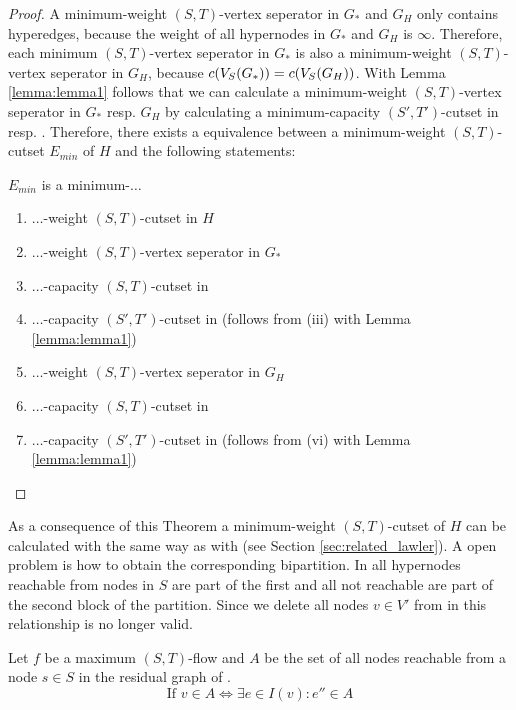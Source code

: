 \begin{proof}
A minimum-weight $(S,T)$-vertex seperator in $G_*$ and $G_H$ only contains hyperedges, because
the weight of all hypernodes in $G_*$ and $G_H$ is $\infty$. Therefore, each minimum
$(S,T)$-vertex seperator in $G_*$ is also a minimum-weight $(S,T)$-vertex seperator in $G_H$,
because $c(V_S(G_*)) = c(V_S(G_H))$. With Lemma \ref{lemma:lemma1} follows that we can calculate
a minimum-weight $(S,T)$-vertex seperator in $G_*$ resp. $G_H$ by calculating a minimum-capacity
$(S',T')$-cutset in  resp. . Therefore, there exists a equivalence
between a minimum-weight $(S,T)$-cutset $E_{min}$ of $H$ and the following statements: 

$E_{min}$ is a minimum-$\ldots$
\begin{enumerate}
\item $\ldots$-weight $(S,T)$-cutset in $H$
\item $\ldots$-weight $(S,T)$-vertex seperator in $G_*$
\item $\ldots$-capacity $(S,T)$-cutset in 
\item $\ldots$-capacity $(S',T')$-cutset in  (follows from (iii) with Lemma \ref{lemma:lemma1})
\item $\ldots$-weight $(S,T)$-vertex seperator in $G_H$
\item $\ldots$-capacity $(S,T)$-cutset in 
\item $\ldots$-capacity $(S',T')$-cutset in  (follows from (vi) with Lemma \ref{lemma:lemma1})
\end{enumerate}

\end{proof}

As a consequence of this Theorem a minimum-weight $(S,T)$-cutset of $H$ can be calculated with
 the same way as with  (see Section \ref{sec:related_lawler}). A open
problem is how to obtain the corresponding bipartition. In  all hypernodes
reachable from nodes in $S$ are part of the first and all not reachable are part of the
second block of the partition. Since we delete all nodes $v \in V'$ from  
in  this relationship is no longer valid. 

\begin{lemma}
\label{lemma:bipartition_construction}
Let $f$ be a maximum $(S,T)$-flow and $A$ be the set of all nodes reachable
from a node $s \in S$ in the residual graph of .
\[ \text{If } v \in A \Leftrightarrow \exists e \in I(v): e'' \in A \]
\end{lemma}

